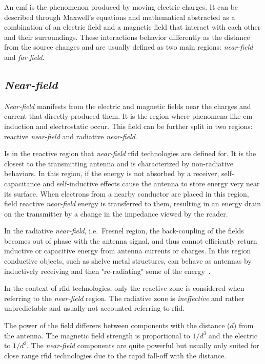 An \ac{emf} is the phenomenon produced by moving electric charges. It can be described through Maxwell's equations and mathematical abstracted as a combination of an electric field and a magnetic field that interact with each other and their surroundings.
These interactions behavior differently as the distance from the source changes and are usually defined as two main regions: \emph{near-field} and \emph{far-field}.

\subsection{\emph{Near-field}}

\emph{Near-field} manifests from the electric and magnetic fields near the charges and current that directly produced them. It is the region where phenomena like \ac{em} induction and electrostatic occur.
This field can be further split in two regions: reactive \emph{near-field} and radiative \emph{near-field}.

Is in the reactive region that \emph{near-field} \ac{rfid} technologies are defined for. It is the closest to the transmitting antenna and is characterized by non-radiative behaviors. In this region, if the energy is not absorbed by a receiver, self-capacitance and self-inductive effects cause the antenna to store energy very near its surface. When electrons from a nearby conductor are placed in this region, field reactive \emph{near-field} energy is transferred to them, resulting in an energy drain on the transmitter by a change in the impedance viewed by the reader.

In the radiative \emph{near-field}, i.e.\ Fresnel region, the back-coupling of the fields becomes out of phase with the antenna signal, and thus cannot efficiently return inductive or capacitive energy from antenna currents or charges.
In this region conductive objects, such as shelve metal structures, can behave as antennas by inductively receiving and then "re-radiating" some of the energy~\cite{ElectromagneticRadiationField}.

In the context of \ac{rfid} technologies, only the reactive zone is considered when referring to the \emph{near-field} region. The radiative zone is \textit{ineffective} and rather unpredictable and usually not accounted referring to \ac{rfid}.

The power of the field differers between components with the distance ($d$) from the antenna. The magnetic field strength is proportional to $1/d^3$ and the electric to $1/d^2$. The \emph{near-field} components are quite powerful but usually only suited for close range \ac{rfid} technologies due to the rapid fall-off with the distance.

